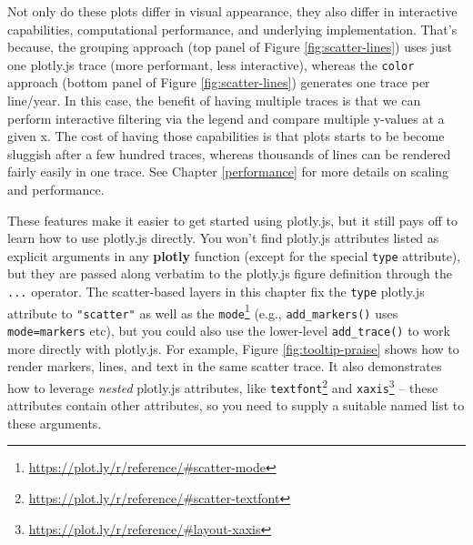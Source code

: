 \documentclass[
  12pt,
]{krantz}
\renewcommand{\href}[2]{#2\footnote{\url{#1}}}
\begin{document}
Not only do these plots differ in visual appearance, they also differ in interactive capabilities, computational performance, and underlying implementation. That's because, the grouping approach (top panel of Figure \ref{fig:scatter-lines}) uses just one plotly.js trace (more performant, less interactive), whereas the \texttt{color} approach (bottom panel of Figure \ref{fig:scatter-lines}) generates one trace per line/year. In this case, the benefit of having multiple traces is that we can perform interactive filtering via the legend and compare multiple y-values at a given x. The cost of having those capabilities is that plots starts to be become sluggish after a few hundred traces, whereas thousands of lines can be rendered fairly easily in one trace. See Chapter \ref{performance} for more details on scaling and performance.

These features make it easier to get started using plotly.js, but it still pays off to learn how to use plotly.js directly. You won't find plotly.js attributes listed as explicit arguments in any \textbf{plotly} function (except for the special \texttt{type} attribute), but they are passed along verbatim to the plotly.js figure definition through the \texttt{...} operator. The scatter-based layers in this chapter fix the \texttt{type} plotly.js attribute to \texttt{"scatter"} as well as the \href{https://plot.ly/r/reference/\#scatter-mode}{\texttt{mode}} (e.g., \texttt{add\_markers()} uses \texttt{mode=\textquotesingle{}markers\textquotesingle{}} etc), but you could also use the lower-level \texttt{add\_trace()} to work more directly with plotly.js. For example, Figure \ref{fig:tooltip-praise} shows how to render markers, lines, and text in the same scatter trace. It also demonstrates how to leverage \emph{nested} plotly.js attributes, like \href{https://plot.ly/r/reference/\#scatter-textfont}{\texttt{textfont}} and \href{https://plot.ly/r/reference/\#layout-xaxis}{\texttt{xaxis}} -- these attributes contain other attributes, so you need to supply a suitable named list to these arguments.
\end{document}

